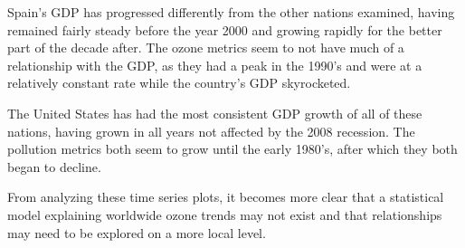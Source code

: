 \documentclass[11pt, oneside]{article}
\theoremstyle{definition}
\begin{document}
Spain's GDP has progressed differently from the other nations examined, having remained fairly steady before the year 2000 and growing rapidly for the better part of the decade after. The ozone metrics seem to not have much of a relationship with the GDP, as they had a peak in the 1990's and were at a relatively constant rate while the country's GDP skyrocketed.


The United States has had the most consistent GDP growth of all of these nations, having grown in all years not affected by the 2008 recession. The pollution metrics both seem to grow until the early 1980's, after which they both began to decline. 

From analyzing these time series plots, it becomes more clear that a statistical model explaining worldwide ozone trends may not exist and that relationships may need to be explored on a more local level.  





\newpage



\end{document}
